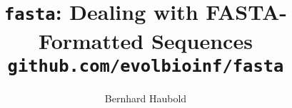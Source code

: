 \documentclass[a4paper]{article}
\begin{document}
\pagestyle{noweb}

\title{\texttt{fasta}: Dealing with FASTA-Formatted Sequences\\
\small \texttt{github.com/evolbioinf/fasta}}
\author{Bernhard Haubold}
\maketitle
\tableofcontents





\end{document}
